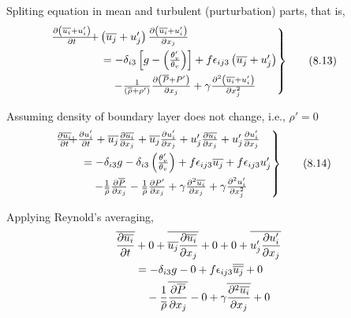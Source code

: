 \documentclass[fleqn,10pt]{SelfArx} %
\begin{document}
Spliting equation in mean and turbulent (purturbation) parts, that is,
\begin{align*}
	\begin{rcases}
		\mspace{-20mu} \frac{\partial\left(\overline{u_i} + u_i'\right)}{\partial t} & \!\!\!\!\!\!\! + \left(\overline{u_j} + u_j' \right)\frac{\partial \left(\overline{u_i} + u_i'\right)}{\partial x_j} \\ &= -\delta_{i3}\left[g - \left(\frac{\theta_v'}{\theta_v}\right)\right] + f \epsilon_{ij3}\left(\overline{u_j} + u_j'\right) \\ &\quad -\frac{1}{\left(\overline{\rho} + \rho'\right)}\frac{\partial \left(\overline{P} + P'\right)}{\partial x_j} + \gamma\frac{\partial^2 \left(\overline{u_i} + u_i'\right)}{\partial x_j^2}
	\end{rcases} & \tag{8.13} \label{eq:8.13}
\end{align*}

Assuming density of boundary layer does not change, i.e., $\rho' = 0$
\begin{align*}
	\begin{rcases}
		\mspace{-20mu} \frac{\partial \overline{u_i}}{\partial t} & \!\!\!\!\!\!\!\! + \frac{\partial u_i'}{\partial t} + \overline{u_j}\frac{\partial \overline{u_i}}{\partial x_j} +\overline{u_j}\frac{\partial u_i'}{\partial x_j} + u_j'\frac{\partial \overline{u_i}}{\partial x_j} + u_j'\frac{\partial u_i'}{\partial x_j} \\
		&= -\delta_{i3}g - \delta_{i3}\left(\frac{\theta_v'}{\theta_v}\right) + f \epsilon_{ij3}\overline{u_j} + f \epsilon_{ij3} u_j' \\ 
		&\quad - \frac{1}{\overline{\rho}}\frac{\partial\overline{P}}{\partial x_j} - \frac{1}{\overline{\rho}}\frac{\partial P'}{\partial x_j} + \gamma\frac{\partial^2 \overline{u_i}}{\partial x_j} + \gamma\frac{\partial^2 u_i'}{\partial x_j^2}
	\end{rcases} & \tag{8.14} \label{eq:8.14}
\end{align*}

Applying Reynold's averaging,
\begin{align*}
	\mspace{-20mu} \overline{\frac{\partial \overline{u_i}}{\partial t}} &+ 0 + \overline{\overline{u_j}\frac{\partial \overline{u_i}}{\partial x_j}} + 0 + 0 + \overline{u_j'\frac{\partial u_i'}{\partial x_j}} \\ 
	&= -\delta_{i3}g - 0 + f \epsilon_{ij3}\overline{\overline{u_j}} + 0 \\ 
	&\quad - \frac{1}{\overline{\rho}}\overline{\frac{\partial\overline{P}}{\partial x_j}} - 0 + \gamma\overline{\frac{\partial^2 \overline{u_i}}{\partial x_j}} + 0
\end{align*}
\end{document}
